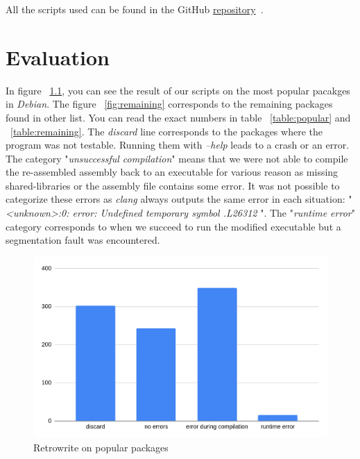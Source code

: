 \documentclass[a4paper,11pt,oneside]{report}
\newcommand{\sysname}{Retrowrite\xspace}
\begin{document}
All the scripts used can be found in the GitHub
\href{https://github.com/ha2san/debian_docker/tree/main/scripts}{repository}~\cite{repo}.

\chapter{Evaluation}
In figure ~\ref{fig:popular}, you can see the result of our scripts on the most
popular pacakges in \textit{Debian}. The figure ~\ref{fig:remaining}
corresponds to the remaining packages found in other list. You can read the
exact numbers in table ~\ref{table:popular} and ~\ref{table:remaining}. The
\textit{discard} line corresponds to the packages where the program was not
testable. Running them with \textit{--help} leads to a crash or an error. 
The category "\textit{unsuccessful compilation}" means that we were not able to
compile the re-assembled assembly back to an executable for various reason as
missing shared-libraries or the assembly file contains some error. It was not
possible to categorize these errors as \textit{clang} always outputs the same
error in each situation: "\textit{<unknown>:0: error: Undefined temporary symbol .L26312
}". The "\textit{runtime error}" category corresponds to when we succeed to run
the modified executable but a segmentation fault was encountered.


\begin{figure}[h]
    \centering
    \includegraphics[width=15cm]{popular_packages.png} 
    \caption{\sysname on popular packages}
    \label{fig:popular}
\end{figure}
\end{document}
